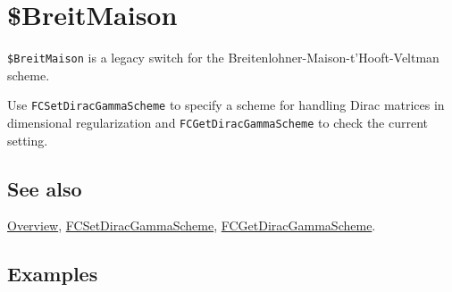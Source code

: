 \documentclass[../FeynCalcManual.tex]{subfiles}
\begin{document}
\hypertarget{dollarbreitmaison}{
\section{\$BreitMaison}\label{dollarbreitmaison}}

\texttt{\$BreitMaison} is a legacy switch for the
Breitenlohner-Maison-t'Hooft-Veltman scheme.

Use \texttt{FCSetDiracGammaScheme} to specify a scheme for handling
Dirac matrices in dimensional regularization and
\texttt{FCGetDiracGammaScheme} to check the current setting.

\subsection{See also}

\hyperlink{toc}{Overview},
\hyperlink{fcsetdiracgammascheme}{FCSetDiracGammaScheme},
\hyperlink{fcgetdiracgammascheme}{FCGetDiracGammaScheme}.

\subsection{Examples}
\end{document}
